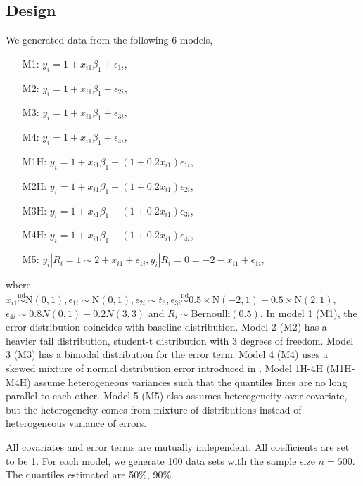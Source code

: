 \documentclass[12pt]{article}
\begin{document}
\subsection{Design}
We generated data from the following 6 models,
\begin{itemize}
\item [M1:] $y_i = 1 + x_{i1}\beta_1 + \epsilon_{1i}$,
\item [M2:] $y_i = 1 + x_{i1}\beta_1 + \epsilon_{2i}$,
\item [M3:] $y_i = 1 + x_{i1}\beta_1 + \epsilon_{3i}$,
\item [M4:] $y_i = 1 + x_{i1}\beta_1 + \epsilon_{4i}$,
\item [M1H:] $y_i = 1 + x_{i1}\beta_1 + (1 + 0.2x_{i1})
  \epsilon_{1i}$,
\item [M2H:] $y_i = 1 + x_{i1}\beta_1 + (1 + 0.2x_{i1})
  \epsilon_{2i}$,
\item [M3H:] $y_i = 1 + x_{i1}\beta_1 + (1 + 0.2x_{i1})
  \epsilon_{3i}$,
\item [M4H:] $y_i = 1 + x_{i1}\beta_1 + (1 + 0.2x_{i1})
  \epsilon_{4i}$,
\item [M5:] $y_{i} | R_i = 1 \sim 2 + x_{i1} + \epsilon_{1i}, y_{i}|
  R_i = 0 = -2 - x_{i1} + \epsilon_{1i}$,
\end{itemize}
where $x_{i1} \stackrel{\mbox{iid}}{\sim} \mathrm{N}(0,1),
\epsilon_{1i} \sim \mathrm{N}(0,1), \epsilon_{2i} \sim t_3,
\epsilon_{3i} \stackrel{\mbox{iid}}{\sim} 0.5 \times \mathrm{N}(-2,1)
+ 0.5 \times \mathrm{N}(2,1)$, $\epsilon_{4i} \sim 0.8 N(0,1) + 0.2
N(3,3)$ and $R_i \sim \mbox{Bernoulli}(0.5)$. In model 1 (M1), the
error distribution coincides with baseline distribution. Model 2 (M2)
has a heavier tail distribution, student-t distribution with 3 degrees
of freedom. Model 3 (M3) has a bimodal distribution for the error
term.  Model 4 (M4) uses a skewed mixture of normal distribution error
introduced in \citet{reich2010}. Model 1H-4H (M1H-M4H) assume
heterogeneous variances such that the quantiles lines are no long
parallel to each other. Model 5 (M5) also assumes heterogeneity over
covariate, but the heterogeneity comes from mixture of distributions
instead of heterogeneous variance of errors.

All covariates and error terms are mutually independent. All
coefficients are set to be 1. For each model, we generate 100 data
sets with the sample size $n=500$. The quantiles estimated are 50\%,
90\%.
\end{document}
